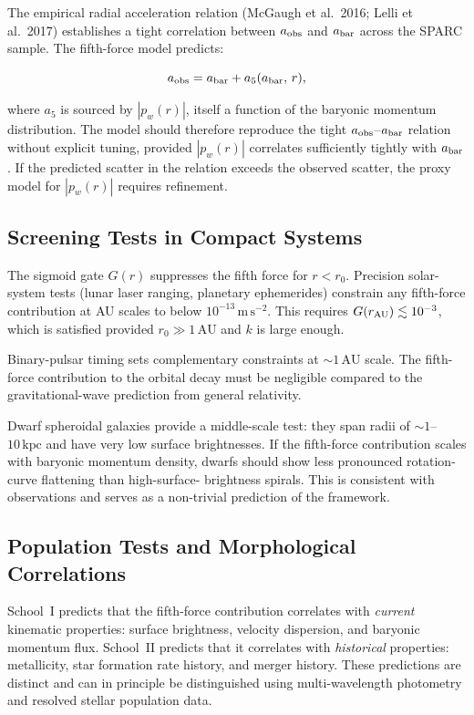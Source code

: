 \documentclass[11pt,a4paper]{article}
\newcommand{\pw}{p_w}                        %
\newcommand{\afiver}{a_5}                    %
\newcommand{\aobs}{a_{\rm obs}}              %
\newcommand{\abar}{a_{\rm bar}}              %
\begin{document}
The empirical radial acceleration relation (McGaugh et al.\ 2016; Lelli et
al.\ 2017) establishes a tight correlation between $\aobs$ and $\abar$
across the SPARC sample.  The fifth-force model predicts:

\[
  \aobs = \abar + \afiver(\abar,\,r) ,
\]

where $\afiver$ is sourced by $|\pw(r)|$, itself a function of the baryonic
momentum distribution.  The model should therefore reproduce the tight
$\aobs$--$\abar$ relation without explicit tuning, provided $|\pw(r)|$
correlates sufficiently tightly with $\abar$.  If the predicted scatter in
the relation exceeds the observed scatter, the proxy model for $|\pw(r)|$
requires refinement.

\subsection{Screening Tests in Compact Systems}\label{sec:screentest}

The sigmoid gate $G(r)$ suppresses the fifth force for $r < r_0$.  Precision
solar-system tests (lunar laser ranging, planetary ephemerides) constrain any
fifth-force contribution at AU scales to below $10^{-13}\,\mathrm{m\,s^{-2}}$.
This requires $G(r_{\rm AU}) \lesssim 10^{-3}$, which is satisfied provided
$r_0 \gg 1\,\mathrm{AU}$ and $k$ is large enough.

Binary-pulsar timing sets complementary constraints at $\sim 1\,\mathrm{AU}$
scale.  The fifth-force contribution to the orbital decay must be negligible
compared to the gravitational-wave prediction from general relativity.

Dwarf spheroidal galaxies provide a middle-scale test: they span radii of
$\sim 1$--$10\,\mathrm{kpc}$ and have very low surface brightnesses.  If
the fifth-force contribution scales with baryonic momentum density, dwarfs
should show less pronounced rotation-curve flattening than high-surface-
brightness spirals.  This is consistent with observations and serves as
a non-trivial prediction of the framework.

\subsection{Population Tests and Morphological Correlations}\label{sec:poptest}

School~I predicts that the fifth-force contribution correlates with
\emph{current} kinematic properties: surface brightness, velocity dispersion,
and baryonic momentum flux.  School~II predicts that it correlates with
\emph{historical} properties: metallicity, star formation rate history, and
merger history.  These predictions are distinct and can in principle be
distinguished using multi-wavelength photometry and resolved stellar population
data.
\end{document}
